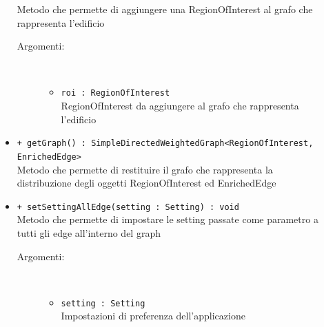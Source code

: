 \documentclass[../DefinizioneDiProdotto.tex]{subfiles}
\begin{document}
\begin{description}
\begin{itemize}
		Metodo che permette di aggiungere una RegionOfInterest al grafo che rappresenta l'edificio
		\begin{description}
			\item[Argomenti:] \
			\begin{itemize}
				\item \texttt{roi : RegionOfInterest}\\
				RegionOfInterest da aggiungere al grafo che rappresenta l'edificio\end{itemize}
		\end{description}
		\item \texttt{+ getGraph() : SimpleDirectedWeightedGraph<RegionOfInterest,\\EnrichedEdge>}\\
		Metodo che permette di restituire il grafo che rappresenta la distribuzione degli oggetti RegionOfInterest ed EnrichedEdge
		\item \texttt{+ setSettingAllEdge(setting : Setting) : void}\\
		Metodo che permette di impostare le setting passate come parametro a tutti gli edge all'interno del graph
		\begin{description}
			\item[Argomenti:] \
			\begin{itemize}
				\item \texttt{setting : Setting}\\
				Impostazioni di preferenza dell'applicazione\end{itemize}
		\end{description}
	\end{itemize}
\end{description}
\end{document}
